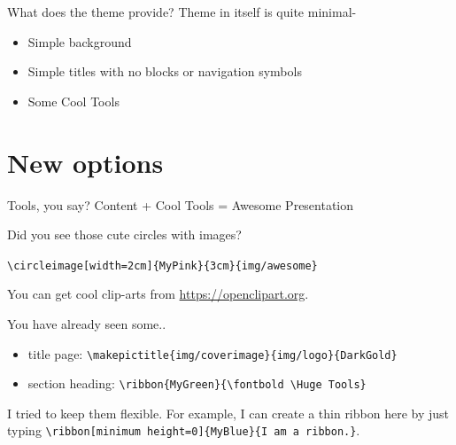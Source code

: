 \documentclass[xetex, aspectratio=169,professionalfont]{beamer}
\begin{document}
\begin{frame}[fragile]{What does the theme provide?}
	Theme in itself is quite minimal-
	\begin{itemize}
		\item Simple background
		\item Simple titles with no blocks or navigation symbols
		\item \alert{Some Cool Tools}
	\end{itemize}
	
\end{frame}

\section{New options}
\begin{frame}
	\vspace{2\baselineskip}
\end{frame}

\begin{frame}[fragile]{Tools, you say?}
\centering
	\alert{Content + Cool Tools = Awesome Presentation}\vspace*{\baselineskip}
	
		Did you see those cute circles with images?

\verb|\circleimage[width=2cm]{MyPink}{3cm}{img/awesome}| \vspace*{\baselineskip}


		
		You can get cool clip-arts from \url{https://openclipart.org}.

	
\end{frame}

\begin{frame}[fragile]{You have already seen some..}
	\centering 
	\begin{itemize}
		\item title page: \verb|\makepictitle{img/coverimage}{img/logo}{DarkGold}|
		\item section heading: \verb|\ribbon{MyGreen}{\fontbold \Huge Tools}|
	\end{itemize}
	I tried to keep them flexible. For example, I can create a thin ribbon here by just typing \verb|\ribbon[minimum height=0]{MyBlue}{I am a ribbon.}|.

\end{frame}
\end{document}
